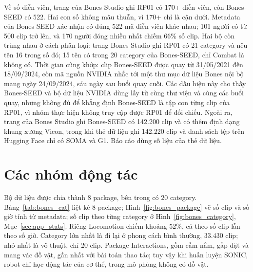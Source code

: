 \documentclass[12pt,a4paper,oneside]{report}
\begin{document}
Về số diễn viên, trang của Bones Studio ghi RP01 có 170+ diễn viên, còn Bones-SEED có 522. Hai con số không mâu thuẫn, vì 170+ chỉ là cận dưới. Metadata của Bones-SEED xác nhận có đúng 522 mã diễn viên khác nhau; 101 người có từ 500 clip trở lên, và 170 người đóng nhiều nhất chiếm 66\% số clip. Hai bộ còn trùng nhau ở cách phân loại: trang Bones Studio ghi RP01 có 21 category và nêu tên 16 trong số đó; 15 tên có trong 20 category của Bones-SEED, chỉ Combat là không có. Thời gian cũng khớp: clip Bones-SEED được quay từ 31/05/2021 đến 18/09/2024, còn mã nguồn NVIDIA nhắc tới một thư mục dữ liệu Bones nội bộ mang ngày 24/09/2024, sáu ngày sau buổi quay cuối. Các dấu hiệu này cho thấy Bones-SEED và bộ dữ liệu NVIDIA dùng lấy từ cùng thư viện và cùng các buổi quay, nhưng không đủ để khẳng định Bones-SEED là tập con từng clip của RP01, vì nhóm thực hiện không truy cập được RP01 để đối chiếu. Ngoài ra, trang của Bones Studio ghi Bones-SEED có 142.200 clip và có thêm định dạng khung xương Vicon, trong khi thẻ dữ liệu ghi 142.220 clip và danh sách tệp trên Hugging Face chỉ có SOMA và G1. Báo cáo dùng số liệu của thẻ dữ liệu.

\section{Các nhóm động tác}
\label{sec:bones_groups}

Bộ dữ liệu được chia thành 8 package, bên trong có 20 category. Bảng~\ref{tab:bones_cat} liệt kê 8 package; Hình~\ref{fig:bones_package} vẽ số clip và số giờ tính từ metadata; số clip theo từng category ở Hình~\ref{fig:bones_category}, Mục~\ref{sec:app_stats}. Riêng Locomotion chiếm khoảng 52\%, cả theo số clip lẫn theo số giờ. Category lớn nhất là đi lại ở phong cách bình thường, 33.430 clip; nhỏ nhất là võ thuật, chỉ 20 clip. Package Interactions, gồm cầm nắm, gắp đặt và mang vác đồ vật, gần nhất với bài toán thao tác; tuy vậy khi huấn luyện SONIC, robot chỉ học động tác của cơ thể, trong mô phỏng không có đồ vật.
\end{document}
